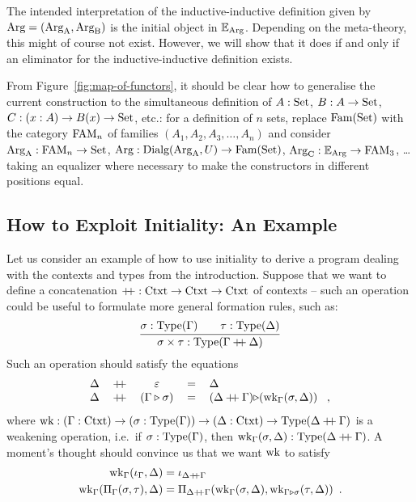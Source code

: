 \documentclass[orivec,envcountsame, ,envcountsect]{llncs}
\begin{document}
\begin{remark}
  The intended interpretation of the inductive-inductive definition
  given by $\text{Arg} = (\text{Arg}_{\text{A}}, \text{Arg}_{\text{B}})$ is the initial object in
  $\mathbb{E}_{\text{Arg}}$. Depending on the meta-theory, this might of
  course not exist. However, we will show that it does if and only if
  an eliminator for the inductive-inductive definition exists.
\end{remark}

\begin{remark} %
  From Figure~\ref{fig:map-of-functors}, it should be clear how to
  generalise the current construction to the simultaneous definition
  of $A : \text{Set}$, $B : A \to \text{Set}$, $C : {(x : A)} \to B(x) \to \text{Set}$,
  etc.: for a definition of $n$ sets, replace $\text{Fam}(\text{Set})$ with the category $\text{FAM}_n$ of families $(A_1, A_2, A_3, \ldots, A_n)$ and
  consider $\text{Arg}_{\text{A}} : \text{FAM}_n \to \text{Set}$, $\text{Arg} : \text{Dialg}(\text{Arg}_{\text{A}}, U) \to
  \text{Fam}(\text{Set})$, $\text{Arg}_{\text{C}} : \mathbb{E}_{\text{Arg}} \to \text{FAM}_3$, \ldots taking an
  equalizer where necessary to make the constructors in different
  positions equal.
\end{remark}

\subsection{How to Exploit Initiality: An Example}
\label{sec:exploit-init}

Let us consider an example of how to use initiality to
derive a program dealing with the contexts and types from the introduction.
Suppose that we want to define a concatenation $\mathbin{+\mkern-6mu+} : \text{Ctxt}
\to \text{Ctxt} \to \text{Ctxt}$ of contexts -- such an operation could be useful
to formulate more general
formation rules, such as:
\[
\infer{\sigma \times \tau : \Type(\Gamma \concatCtxt \Delta)}{\sigma : \Type(\Gamma) \quad & \tau : \Type(\Delta)}
\]
Such an operation should satisfy the equations
\[
\begin{tabular}{lcccl}
  $\Delta$ & $\concatCtxt$ & $\emptyCtxt$ & $=$ & $\Delta$ \\
  $\Delta$ & $\concatCtxt$ & $(\consCtxt{\Gamma}{\sigma})$ & $=$ & $\consCtxt{(\Delta \concatCtxt \Gamma)}{$(\wkapp{\Gamma}{\Delta}{\sigma})$}$ \enspace ,
\end{tabular}
\]
where $\text{wk} : (\Gamma : \text{Ctxt}) \to (\sigma : \text{Type}(\Gamma)) \to (\Delta
: \text{Ctxt}) \to \text{Type}(\Delta \mathbin{+\mkern-6mu+} \Gamma)$ is a weakening
operation, i.e.\ if $\sigma : \text{Type}(\Gamma)$, then
$\text{wk}_{\Gamma}(\sigma, \Delta) : \text{Type}(\Delta \mathbin{+\mkern-6mu+} \Gamma)$. A
moment's thought should convince us that we want $\text{wk}$ to satisfy
\begin{align*}
  \text{wk}_{\Gamma}(\iota_{\Gamma}, \Delta) &= \iota_{\Delta \mathbin{+\mkern-6mu+} \Gamma} \\
  \text{wk}_{\Gamma}(\Pi_{\Gamma}(\sigma, \tau), \Delta) &= \Pi_{\Delta \mathbin{+\mkern-6mu+} \Gamma}(\text{wk}_{\Gamma}(\sigma, \Delta), \text{wk}_{\Gamma \triangleright \sigma}(\tau, \Delta)) \enspace .
\end{align*}
\end{document}
